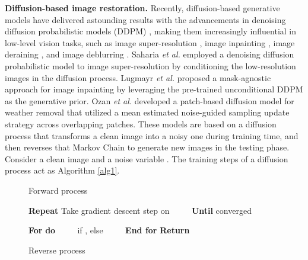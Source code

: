 \documentclass{article}
\begin{document}
\textbf{Diffusion-based image restoration.}
Recently, diffusion-based generative models \cite{sohl2015deep} have delivered astounding results with the advancements in denoising diffusion probabilistic models (DDPM) \cite{ho2020denoising,nichol2021improved}, making them increasingly influential in low-level vision tasks, such as image super-resolution \cite{kawar2022denoising,saharia2022image}, image inpainting \cite{rombach2022high,lugmayr2022repaint}, image deraining \cite{ozdenizci2023restoring}, and image deblurring \cite{whang2022deblurring}.
Saharia \textit{et al.} \cite{saharia2022image} employed a denoising diffusion probabilistic model to image super-resolution by conditioning the low-resolution images in the diffusion process.
Lugmayr \textit{et al.} \cite{lugmayr2022repaint} proposed a mask-agnostic approach for image inpainting by leveraging the pre-trained unconditional DDPM as the generative prior.
Ozan \emph{et al.} \cite{ozdenizci2023restoring} developed a patch-based diffusion model for weather removal that utilized a mean estimated noise-guided sampling update strategy across overlapping patches.
These models are based on a diffusion process that transforms a clean image into a noisy one during training time, and then reverses that Markov Chain to generate new images in the testing phase.
Consider a clean image  and a noise variable . The training steps of a diffusion process act as Algorithm \ref{alg1}.


\begin{figure}[t]
  \centering
  \begin{minipage}[t]{0.49\linewidth}
    \begin{algorithm}[H]
      \caption{Forward process}
      \label{alg1}
      \begin{algorithmic}[1]
        \State \textbf{Repeat}
        \State 
        \State 
        \State 
        \State Take gradient descent step on
        \State ~~~~ \label{alg1:closedform}
        \State \textbf{Until} converged
      \end{algorithmic}
    \end{algorithm}
  \end{minipage}
  \hfill
  \begin{minipage}[t]{0.49\linewidth}
    \begin{algorithm}[H]
    \label{line:reverse}
      \caption{Reverse process}
      \label{alg2}
      \begin{algorithmic}[1]
        \vspace{1.2mm}
        \State 
        \State \textbf{For}  \textbf{do}
        \State ~~~~ if , else 
        \State ~~~~
        \State \textbf{End for}
        \State \textbf{Return} 
        \vspace{1.2mm}
      \end{algorithmic}
    \end{algorithm}
  \end{minipage}
\end{figure}
\end{document}
